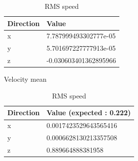 \documentclass[a4paper,12pt]{article}
\theoremstyle{definition}
\begin{document}
\begin{table}[h]
\centering
\begin{minipage}{0.45\textwidth}
\centering
\begin{tabular}{ll}
\toprule
\textbf{Direction} & \textbf{Value} \\
\midrule
x & 7.787999493302777e-05 \\
y & 5.701697227777913e-05 \\
z & -0.030603401362895966 \\
\bottomrule
\end{tabular}
\caption{Velocity mean}
\label{PsiKappaSigmaMean}
\end{minipage}
\hfill
\begin{minipage}{0.45\textwidth}
\centering
\begin{tabular}{ll}
\toprule
\textbf{Direction} & \textbf{Value (expected : 0.222)} \\
\midrule
x & 0.0017423529643565416 \\
y & 0.0006628130213357508 \\
z & 0.889664888381958 \\
\bottomrule
\end{tabular}
\caption{RMS speed}
\label{PsiKappaSigmaRMS}
\end{minipage}
\end{table}
\end{document}
